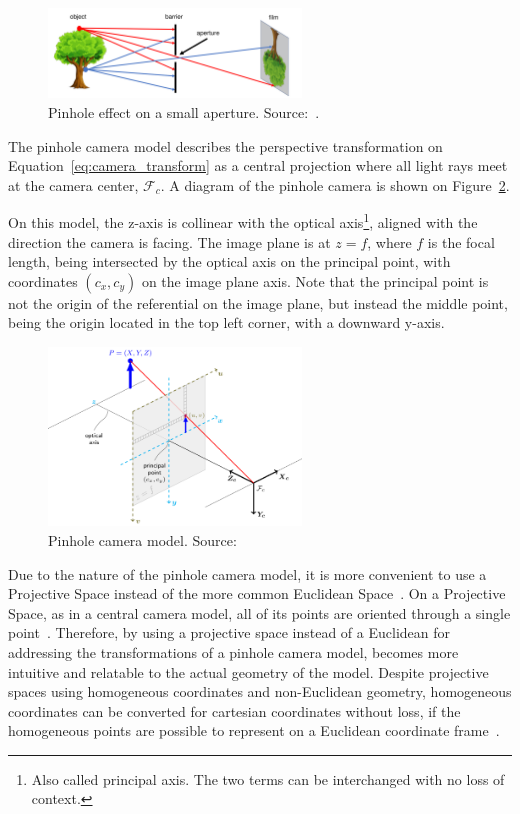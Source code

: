 \begin{figure}[!ht]
	\centering
	\includegraphics[width=0.6\textwidth]{img/camera/pnhole_effect.png}
	\caption[Pinhole effect on a small aperture.]{Pinhole effect on a small aperture. Source:~\cite{camera_models}.}
	\label{fig:pinhole_effect}
\end{figure}

The pinhole camera model describes the perspective transformation on Equation~\eqref{eq:camera_transform} as a central projection where all light rays meet at the camera center, $\mathcal{F}_c$. A diagram of the pinhole camera is shown on Figure~\ref{fig:pinhole_camera_model}. 

On this model, the z-axis is collinear with the optical axis\footnote{Also called principal axis. The two terms can be interchanged with no loss of context.}, aligned with the direction the camera is facing. The image plane is at $z = f$, where $f$ is the focal length, being intersected by the optical axis on the principal point, with coordinates $(c_x, c_y)$ on the image plane axis. Note that the principal point is not the origin of the referential on the image plane, but instead the middle point, being the origin located in the top left corner, with a downward y-axis.

\begin{figure}[!ht]
	\centering
	\includegraphics[width=0.6\textwidth]{img/camera/pinhole_camera_model.png}
	\caption[Pinhole camera model.]{Pinhole camera model. Source:~\cite{opencv_doc}}
	\label{fig:pinhole_camera_model}
\end{figure}

Due to the nature of the pinhole camera model, it is more convenient to use a Projective Space instead of the more common Euclidean Space~\cite{mvg_book, camera_models, Sturm2010}. On a Projective Space, as in a central camera model, all of its points are oriented through a single point~\cite{mvg_book}. Therefore, by using a projective space instead of a Euclidean for addressing the transformations of a pinhole camera model, becomes more intuitive and relatable to the actual geometry of the model. Despite projective spaces using homogeneous coordinates and non-Euclidean geometry, homogeneous coordinates can be converted for cartesian coordinates without loss, if the homogeneous points are possible to represent on a Euclidean coordinate frame~\cite{mvg_book, camera_models}.

